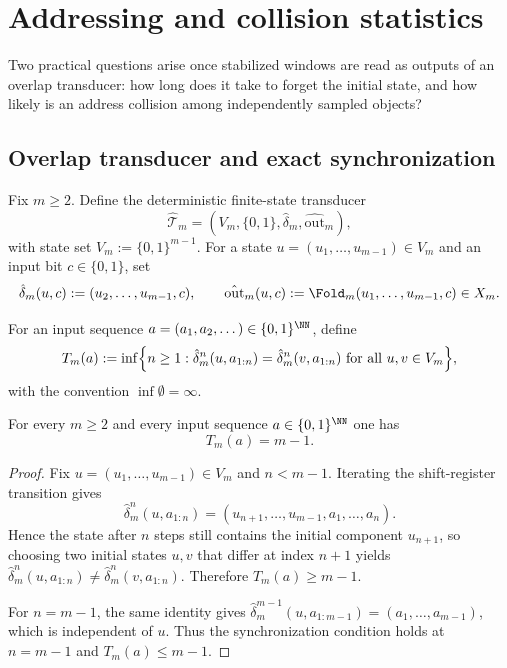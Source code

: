 \section{Addressing and collision statistics}\label{app:addressing}

Two practical questions arise once stabilized windows are read as outputs of an overlap transducer: how long does it take to forget the initial state, and how likely is an address collision among independently sampled objects?

\subsection{Overlap transducer and exact synchronization}\label{sec:causality:sync}

\begin{definition}\label{def:transducer}
Fix $m\ge 2$. Define the deterministic finite-state transducer
\[
\widehat{\mathcal{T}}_m=(V_m,\{0,1\},\hat{\delta}_m,\hat{\mathrm{out}}_m),
\]
with state set $V_m:=\{0,1\}^{m-1}$. For a state $u=(u_1,\dots,u_{m-1})\in V_m$ and an input bit $c\in\{0,1\}$, set
\[
\hat{\delta}_m(u,c):=(u_2,\dots,u_{m-1},c),
\qquad
\hat{\mathrm{out}}_m(u,c):=\Fold_m(u_1,\dots,u_{m-1},c)\in X_m.
\]
\end{definition}

\begin{definition}\label{def:sync-time}
For an input sequence $a=(a_1,a_2,\dots)\in\{0,1\}^{\NN}$, define
\[
T_m(a):=\inf\Bigl\{n\ge 1:\hat{\delta}_m^n(u,a_{1:n})=\hat{\delta}_m^n(v,a_{1:n})\ \text{for all }u,v\in V_m\Bigr\},
\]
with the convention $\inf\emptyset=\infty$.
\end{definition}

\begin{theorem}\label{thm:exact-sync}
For every $m\ge 2$ and every input sequence $a\in\{0,1\}^{\NN}$ one has
\[
T_m(a)=m-1.
\]
\end{theorem}

\begin{proof}
Fix $u=(u_1,\dots,u_{m-1})\in V_m$ and $n<m-1$. Iterating the shift-register transition gives
\[
\hat{\delta}_m^n(u,a_{1:n})=(u_{n+1},\dots,u_{m-1},a_1,\dots,a_n).
\]
Hence the state after $n$ steps still contains the initial component $u_{n+1}$, so choosing two initial states $u,v$ that differ at index $n+1$ yields $\hat{\delta}_m^n(u,a_{1:n})\neq \hat{\delta}_m^n(v,a_{1:n})$. Therefore $T_m(a)\ge m-1$.

For $n=m-1$, the same identity gives $\hat{\delta}_m^{m-1}(u,a_{1:m-1})=(a_1,\dots,a_{m-1})$, which is independent of $u$. Thus the synchronization condition holds at $n=m-1$ and $T_m(a)\le m-1$.
\end{proof}

